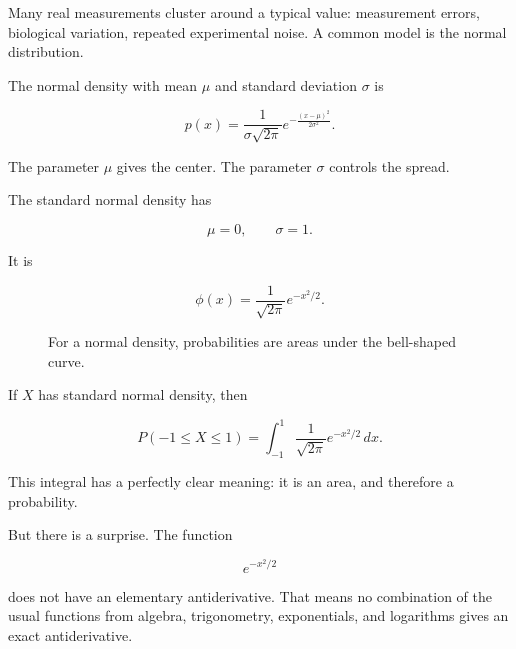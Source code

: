 Many real measurements cluster around a typical value: measurement errors, biological
variation, repeated experimental noise.  A common model is the normal distribution.

The normal density with mean \(\mu\) and standard deviation \(\sigma\) is

\[
p(x)
=
\frac{1}{\sigma\sqrt{2\pi}}
e^{-\frac{(x-\mu)^2}{2\sigma^2}}.
\]

The parameter \(\mu\) gives the center.  The parameter \(\sigma\) controls the spread.

The standard normal density has

\[
\mu=0,
\qquad
\sigma=1.
\]

It is

\[
\phi(x)=\frac1{\sqrt{2\pi}}e^{-x^2/2}.
\]

\begin{figure}[h]
\centering
{}
\caption{For a normal density, probabilities are areas under the bell-shaped curve.}
\label{fig:standard-normal-density}
\end{figure}

If \(X\) has standard normal density, then

\[
P(-1\le X\le1)
=
\int_{-1}^{1}
\frac1{\sqrt{2\pi}}e^{-x^2/2}\,dx.
\]

This integral has a perfectly clear meaning: it is an area, and therefore a probability.

But there is a surprise.  The function

\[
e^{-x^2/2}
\]

does not have an elementary antiderivative.  That means no combination of the usual
functions from algebra, trigonometry, exponentials, and logarithms gives an exact
antiderivative.

